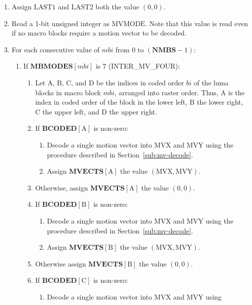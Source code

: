 \documentclass[9pt,letterpaper]{book}
\newcommand{\idx}[1]{{\ensuremath{\mathit{#1}}}}
\newcommand{\bi}{\idx{bi}}
\newcommand{\mbi}{\idx{mbi}}
\newcommand{\bitvar}[1]{\ensuremath{\mathbf{\bm{#1}}}}
\newcommand{\locvar}[1]{\ensuremath{\mathrm{#1}}}
\numberwithin{equation}{chapter}
\numberwithin{figure}{chapter}
\numberwithin{table}{chapter}
\begin{document}
\begin{enumerate}
\item
Assign \locvar{LAST1} and \locvar{LAST2} both the value $(0,0)$.
\item
Read a 1-bit unsigned integer as \locvar{MVMODE}.
Note that this value is read even if no macro blocks require a motion vector to
 be decoded.
\item
For each consecutive value of \locvar{\mbi} from 0 to $(\bitvar{NMBS}-1)$:
\begin{enumerate}
\item
If $\bitvar{MBMODES}[\locvar{\mbi}]$ is 7 (INTER\_MV\_FOUR):
\begin{enumerate}
\item
Let \locvar{A}, \locvar{B}, \locvar{C}, and \locvar{D} be the indices in coded
 order \locvar{\bi} of the luma blocks in macro block \locvar{\mbi}, arranged
 into raster order.
Thus, \locvar{A} is the index in coded order of the block in the lower left,
 \locvar{B} the lower right, \locvar{C} the upper left, and \locvar{D} the
 upper right. %
\item If $\bitvar{BCODED}[\locvar{A}]$ is non-zero:
\begin{enumerate}
\item Decode a single motion vector into \locvar{MVX} and \locvar{MVY} using
 the procedure described in Section~\ref{sub:mv-decode}.
\item Assign $\bitvar{MVECTS}[\locvar{A}]$ the value
 $(\locvar{MVX},\locvar{MVY})$.
\end{enumerate}
\item Otherwise, assign $\bitvar{MVECTS}[\locvar{A}]$ the value $(0,0)$.
\item If $\bitvar{BCODED}[\locvar{B}]$ is non-zero:
\begin{enumerate}
\item Decode a single motion vector into \locvar{MVX} and \locvar{MVY} using
 the procedure described in Section~\ref{sub:mv-decode}.
\item Assign $\bitvar{MVECTS}[\locvar{B}]$ the value
 $(\locvar{MVX},\locvar{MVY})$.
\end{enumerate}
\item
Otherwise assign $\bitvar{MVECTS}[\locvar{B}]$ the value $(0,0)$.
\item If $\bitvar{BCODED}[\locvar{C}]$ is non-zero:
\begin{enumerate}
\item Decode a single motion vector into \locvar{MVX} and \locvar{MVY} using

\end{enumerate}
\end{enumerate}
\end{enumerate}
\end{enumerate}
\end{document}
